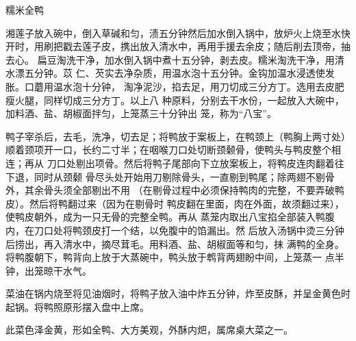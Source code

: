 \begin{recipe}[八宝全鸭]{糯米全鸭}

\ingredients


\preparation

\step 湘莲子放入碗中，倒入草碱和匀，渍五分钟然后加水倒入锅中，放炉火上烧至水快
开时，用刷把戳去莲子皮，携出放入清水中，再用手援去余皮；随后削去顶帝，抽去心。
扁豆淘洗干净，加水倒入锅中煮十五分钟，剥去皮。糯米淘洗干净，用清水漂五分钟。苡
仁、芡实去净杂质，用温水泡十五分钟。金钩加温水浸透使发胀。口蘑用温水泡十分钟，
淘净泥沙，掐去足，用刀切成三分方丁。选用去皮肥瘦火腿，同样切成三分方丁。以上八
种原料，分别去干水份，一起放入大碗中，加料酒、盐、胡椒面拌匀，上笼蒸三十分钟出
笼，称为“八宝”。

\step 鸭子宰杀后，去毛，洗净，切去足；将鸭放于案板上，在鸭颈上（鸭胸上两寸处）
顺着颈项开一口，长约二寸半；在咽喉刀口处切断颈颡骨，使鸭头与鸭皮整个相连；再从
刀口处剔出项骨。然后将鸭子尾部向下立放案板上，将鸭皮连肉翻着往下退，同时从颈颡
骨尽头处开始用刀剔除骨头，一直剔到鸭尾；除两翅不剔骨外，其余骨头须全部剔出不用
（在剔骨过程中必须保持鸭肉的完整，不要弄破鸭皮）。然后将鸭翻过来（因为在剔骨时
鸭皮翻在里面，肉在外面，故须翻过来），使鸭皮朝外，成为一只无骨的完整全鸭。再从
蒸笼内取出八宝掐全部装入鸭腹内，在刀口处将鸭颈皮打一个结，以免腹中的馅漏出。然
后放入汤锅中烫三分钟后捞出，再入清水中，摘尽茸毛。用料酒、盐、胡椒面等和匀，抹
满鸭的全身。将鸭腹朝下，鸭背向上放于大蒸碗中，鸭头放于鹎背两翅盼中间，上笼蒸一
点半钟，出笼晾干水气。

\step 菜油在锅内烧至将见油烟时，将鸭子放入油中炸五分钟，炸至皮酥，并呈金黄色时
起锅。将鸭照原形摆入盘中上席。

\features

此菜色泽金黄，形如全鸭、大方美观，外酥内𤆵，属席桌大菜之一。

\end{recipe}

